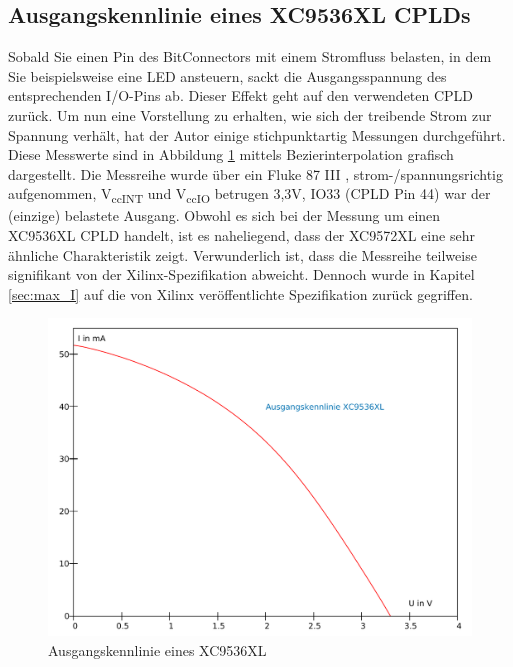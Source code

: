 \documentclass{article}
\begin{document}
\subsection{Ausgangskennlinie eines XC9536XL CPLDs}
Sobald Sie einen Pin des BitConnectors mit einem Stromfluss belasten, in dem Sie beispielsweise eine LED ansteuern, sackt die Ausgangsspannung des entsprechenden I/O-Pins ab. Dieser Effekt geht auf den verwendeten CPLD zurück. Um nun eine Vorstellung zu erhalten, wie sich der treibende Strom zur Spannung verhält, hat der Autor einige stichpunktartig Messungen durchgeführt. Diese Messwerte sind in Abbildung \ref{fig:out_characteristics} mittels Bezierinterpolation grafisch dargestellt.
Die Messreihe wurde über ein Fluke 87 III , strom-/spannungsrichtig aufgenommen, V\textsubscript{ccINT} und V\textsubscript{ccIO} betrugen 3,3V, IO33 (CPLD Pin 44) war der (einzige) belastete Ausgang. Obwohl es sich bei der Messung um einen XC9536XL CPLD handelt, ist es naheliegend, dass der XC9572XL eine sehr ähnliche Charakteristik zeigt. Verwunderlich ist, dass die Messreihe teilweise signifikant von der Xilinx-Spezifikation \autocite[6]{XC_Curves} abweicht.  Dennoch wurde in Kapitel \ref{sec:max_I} auf die von Xilinx veröffentlichte Spezifikation zurück gegriffen.

\newpage

\begin{figure}[!h]
	\centering
	\includegraphics[width=1\linewidth]{Figures/XC9536_output_characteristics}
	\caption{Ausgangskennlinie eines XC9536XL}
	\label{fig:out_characteristics}
\end{figure}
\end{document}
